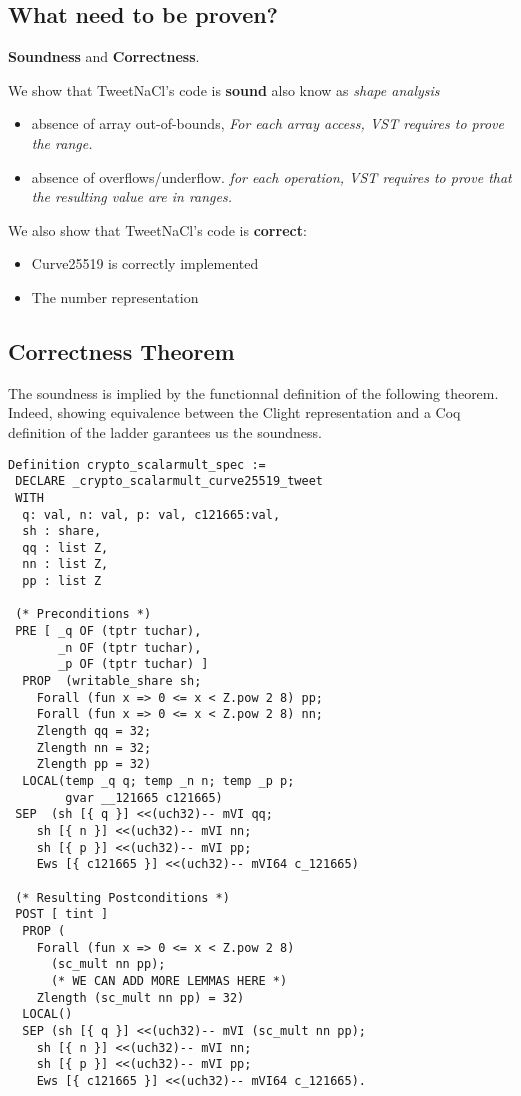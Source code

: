 \subsection{What need to be proven?}

\textbf{Soundness} and \textbf{Correctness}.

We show that TweetNaCl's code is \textbf{sound} also know as \textit{shape analysis} \ie

\begin{itemize}
\item absence of array out-of-bounds,
\textit{For each array access, VST requires to prove the range.}
\item absence of overflows/underflow.
\textit{for each operation, VST requires to prove that the resulting value are in ranges.}
\end{itemize}

We also show that TweetNaCl's code is \textbf{correct}:

\begin{itemize}
\item Curve25519 is correctly implemented
\item The number representation
\end{itemize}

\subsection{Correctness Theorem}

The soundness is implied by the functionnal definition of the following theorem.
Indeed, showing equivalence between the Clight representation and a Coq
definition of the ladder garantees us the soundness.

\begin{lstlisting}
Definition crypto_scalarmult_spec :=
 DECLARE _crypto_scalarmult_curve25519_tweet
 WITH
  q: val, n: val, p: val, c121665:val,
  sh : share,
  qq : list Z,
  nn : list Z,
  pp : list Z

 (* Preconditions *)
 PRE [ _q OF (tptr tuchar),
       _n OF (tptr tuchar),
       _p OF (tptr tuchar) ]
  PROP  (writable_share sh;
    Forall (fun x => 0 <= x < Z.pow 2 8) pp;
    Forall (fun x => 0 <= x < Z.pow 2 8) nn;
    Zlength qq = 32;
    Zlength nn = 32;
    Zlength pp = 32)
  LOCAL(temp _q q; temp _n n; temp _p p;
        gvar __121665 c121665)
 SEP  (sh [{ q }] <<(uch32)-- mVI qq;
    sh [{ n }] <<(uch32)-- mVI nn;
    sh [{ p }] <<(uch32)-- mVI pp;
    Ews [{ c121665 }] <<(uch32)-- mVI64 c_121665)

 (* Resulting Postconditions *)
 POST [ tint ]
  PROP (
    Forall (fun x => 0 <= x < Z.pow 2 8)
      (sc_mult nn pp);
      (* WE CAN ADD MORE LEMMAS HERE *)
    Zlength (sc_mult nn pp) = 32)
  LOCAL()
  SEP (sh [{ q }] <<(uch32)-- mVI (sc_mult nn pp);
    sh [{ n }] <<(uch32)-- mVI nn;
    sh [{ p }] <<(uch32)-- mVI pp;
    Ews [{ c121665 }] <<(uch32)-- mVI64 c_121665).
\end{lstlisting}

